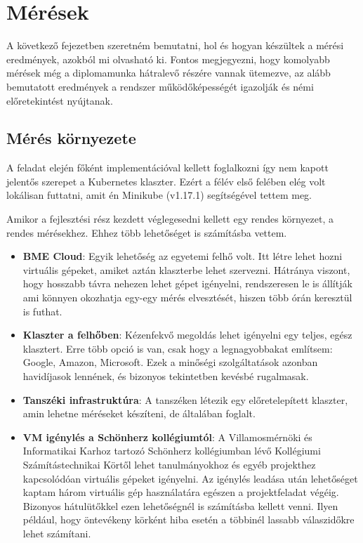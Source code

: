 \chapter{Mérések}
\label{sec:results}

A következő fejezetben szeretném bemutatni, hol és hogyan készültek a mérési eredmények, azokból mi olvasható ki. Fontos megjegyezni, hogy komolyabb mérések még a diplomamunka hátralevő részére vannak ütemezve, az alább bemutatott eredmények a rendszer működőképességét igazolják és némi előretekintést nyújtanak.

\section{Mérés környezete}
A feladat elején főként implementációval kellett foglalkozni így nem kapott jelentős szerepet a Kubernetes klaszter. Ezért  a félév első felében elég volt lokálisan futtatni, amit én Minikube (v1.17.1) segítségével tettem meg. 

Amikor a fejlesztési rész kezdett véglegesedni kellett egy rendes környezet, a rendes mérésekhez. Ehhez több lehetőséget is számításba vettem.	

\begin{itemize}
  \item \textbf{BME Cloud}: Egyik lehetőség az egyetemi felhő volt. Itt létre lehet hozni virtuális gépeket, amiket aztán klaszterbe lehet szervezni. Hátránya viszont, hogy hosszabb távra nehezen lehet gépet igényelni, rendszeresen le is állítják ami könnyen okozhatja egy-egy mérés elvesztését, hiszen több órán keresztül is futhat.
  \item \textbf{Klaszter a felhőben}: Kézenfekvő megoldás lehet igényelni egy teljes, egész klasztert. Erre több opció is van, csak hogy a legnagyobbakat említsem: Google, Amazon, Microsoft. Ezek a minőségi szolgáltatások azonban havidíjasok lennének, és bizonyos tekintetben kevésbé rugalmasak. %
    \item \textbf{Tanszéki infrastruktúra}: A tanszéken létezik egy előretelepített klaszter, amin lehetne méréseket készíteni, de általában foglalt.
      \item \textbf{VM igénylés a Schönherz kollégiumtól}: A Villamosmérnöki és Informatikai Karhoz tartozó Schönherz kollégiumban lévő Kollégiumi Számítástechnikai Körtől lehet tanulmányokhoz és egyéb projekthez kapcsolódóan virtuális gépeket igényelni. Az igénylés leadása után lehetőséget kaptam három virtuális gép használatára egészen a projektfeladat végéig. Bizonyos hátulütőkkel ezen lehetőségnél is számításba kellett venni. Ilyen például, hogy öntevékeny körként hiba esetén a többinél lassabb válaszidőkre lehet számítani.
\end{itemize}		

